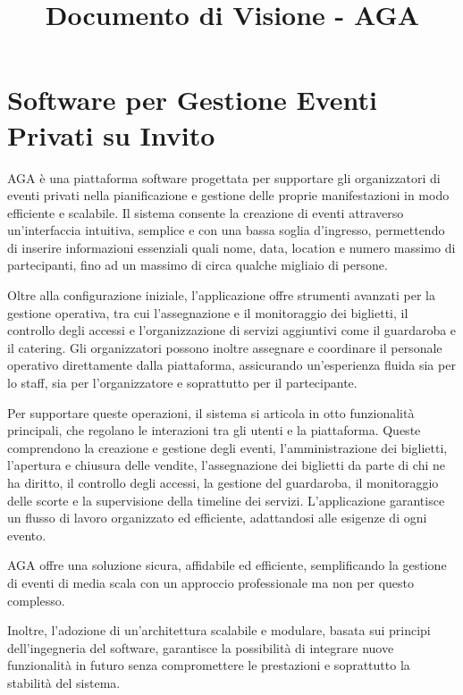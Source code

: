 \documentclass[a4paper]{article}
\title{\textcolor{titlecolor}{\Huge \textbf{ Documento di Visione - AGA}}}
\author{}
\date{}
\begin{document}
\maketitle

\section{Software per Gestione Eventi Privati su Invito}
\textcolor{textcolor}{

AGA è una piattaforma software progettata per supportare gli organizzatori di eventi privati nella pianificazione e gestione delle proprie manifestazioni in modo efficiente e scalabile. Il sistema consente la creazione di eventi attraverso un'interfaccia intuitiva, semplice e con una bassa soglia d’ingresso, permettendo di inserire informazioni essenziali quali nome, data, location e numero massimo di partecipanti, fino ad un massimo di circa qualche migliaio di persone.

Oltre alla configurazione iniziale, l’applicazione offre strumenti avanzati per la gestione operativa, tra cui l’assegnazione e il monitoraggio dei biglietti, il controllo degli accessi e l’organizzazione di servizi aggiuntivi come il guardaroba e il catering. Gli organizzatori possono inoltre assegnare e coordinare il personale operativo direttamente dalla piattaforma, assicurando un’esperienza fluida sia per lo staff, sia per l’organizzatore e soprattutto per il partecipante.

Per supportare queste operazioni, il sistema si articola in otto funzionalità principali, che regolano le interazioni tra gli utenti e la piattaforma. Queste comprendono la creazione e gestione degli eventi, l’amministrazione dei biglietti, l’apertura e chiusura delle vendite, l’assegnazione dei biglietti da parte di chi ne ha diritto, il controllo degli accessi, la gestione del guardaroba, il monitoraggio delle scorte e la supervisione della timeline dei servizi. L’applicazione garantisce un flusso di lavoro organizzato ed efficiente, adattandosi alle esigenze di ogni evento.

AGA offre una soluzione sicura, affidabile ed efficiente, semplificando la gestione di eventi di media scala con un approccio professionale ma non per questo complesso.

Inoltre, l’adozione di un’architettura scalabile e modulare, basata sui principi dell’ingegneria del software, garantisce la possibilità di integrare nuove funzionalità in futuro senza compromettere le prestazioni e soprattutto la stabilità del sistema.
}
\end{document}
